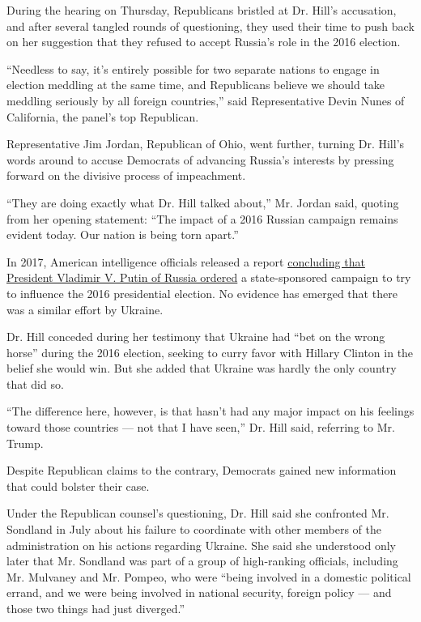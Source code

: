 During the hearing on Thursday, Republicans bristled at Dr. Hill's
accusation, and after several tangled rounds of questioning, they used
their time to push back on her suggestion that they refused to accept
Russia's role in the 2016 election.

``Needless to say, it's entirely possible for two separate nations to
engage in election meddling at the same time, and Republicans believe we
should take meddling seriously by all foreign countries,'' said
Representative Devin Nunes of California, the panel's top Republican.

Representative Jim Jordan, Republican of Ohio, went further, turning Dr.
Hill's words around to accuse Democrats of advancing Russia's interests
by pressing forward on the divisive process of impeachment.

``They are doing exactly what Dr. Hill talked about,'' Mr. Jordan said,
quoting from her opening statement: ``The impact of a 2016 Russian
campaign remains evident today. Our nation is being torn apart.''

In 2017, American intelligence officials released a report
\href{https://www.nytimes3xbfgragh.onion/2017/01/06/us/politics/russia-hack-report.html}{concluding
that President Vladimir V. Putin of Russia ordered} a state-sponsored
campaign to try to influence the 2016 presidential election. No evidence
has emerged that there was a similar effort by Ukraine.

Dr. Hill conceded during her testimony that Ukraine had ``bet on the
wrong horse'' during the 2016 election, seeking to curry favor with
Hillary Clinton in the belief she would win. But she added that Ukraine
was hardly the only country that did so.

``The difference here, however, is that hasn't had any major impact on
his feelings toward those countries --- not that I have seen,'' Dr. Hill
said, referring to Mr. Trump.

Despite Republican claims to the contrary, Democrats gained new
information that could bolster their case.

Under the Republican counsel's questioning, Dr. Hill said she confronted
Mr. Sondland in July about his failure to coordinate with other members
of the administration on his actions regarding Ukraine. She said she
understood only later that Mr. Sondland was part of a group of
high-ranking officials, including Mr. Mulvaney and Mr. Pompeo, who were
``being involved in a domestic political errand, and we were being
involved in national security, foreign policy --- and those two things
had just diverged.''

